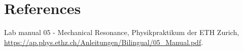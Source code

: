 \section{References}
\begin{thebibliography}{99}

Lab manual 05 - Mechanical Resonance, Physikpraktikum der ETH Zurich,  \url{https://ap.phys.ethz.ch/Anleitungen/Bilingual/05_Manual.pdf}.




\end{thebibliography}